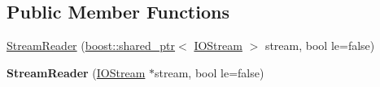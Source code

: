 \subsection*{Public Member Functions}
\begin{DoxyCompactItemize}
\item 
\hyperlink{singleton_assimp_1_1_stream_reader_a65060fe2b5ff752dfe65e6f58bb54fea}{Stream\+Reader} (\hyperlink{classboost_1_1shared__ptr}{boost\+::shared\+\_\+ptr}$<$ \hyperlink{class_assimp_1_1_i_o_stream}{I\+O\+Stream} $>$ stream, bool le=false)
\item 
\hypertarget{singleton_assimp_1_1_stream_reader_a05ab8a7f9bd0dea892c363fb550d93ea}{{\bfseries Stream\+Reader} (\hyperlink{class_assimp_1_1_i_o_stream}{I\+O\+Stream} $\ast$stream, bool le=false)}\label{singleton_assimp_1_1_stream_reader_a05ab8a7f9bd0dea892c363fb550d93ea}


\end{DoxyCompactItemize}
